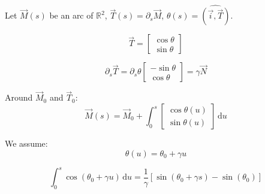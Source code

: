 \documentclass[aps,12pt]{revtex4}
\begin{document}
Let  $\vec{M}(s)$ be an arc of $\mathbb{R}^2$,  $\vec{T}(s) = \partial_s \vec{M}$, $\theta(s) = \widehat{(\vec{i},\vec{T})}$.

\begin{equation}
	\vec{T} = 
	\begin{bmatrix}
	\cos \theta\\
	\sin \theta
	\end{bmatrix}
\end{equation}

\begin{equation}
	\partial_s \vec{T} = \partial_s \theta 
	\begin{bmatrix}
	-\sin\theta\\
	\cos \theta
	\end{bmatrix}
 = \gamma \vec{N}
\end{equation}

Around $\vec{M}_0$ and $\vec{T}_0$:
\begin{equation}
	\vec{M}(s) = \vec{M}_0 + \int_0^s 
	\begin{bmatrix}
	\cos \theta(u)\\
	\sin \theta(u)
	\end{bmatrix}
	\, \mathrm{d}u
\end{equation}

We assume:
\begin{equation}
	\theta(u) = \theta_0 + \gamma u 
\end{equation}

\begin{equation}
	\int_0^s \cos (\theta_0 + \gamma u) \, \mathrm{d}u =
	\dfrac{1}{\gamma}\left[ \sin(\theta_0 + \gamma s) - \sin(\theta_0) \right] 
\end{equation}
\end{document}
